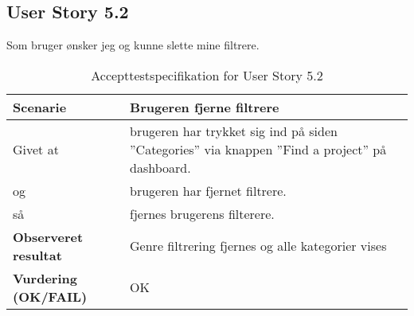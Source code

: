 \subsection{User Story 5.2}
Som bruger ønsker jeg og kunne slette mine filtrere. 

\begin{table}[H]
	\centering
	\caption{Accepttestspecifikation for User Story 5.2 }
	\begin{tabular}{p{6cm}|p{6cm}}
		\hline
		\textbf{Scenarie} & Brugeren fjerne filtrere\\[10px]
		\hline
        Givet at & brugeren har trykket sig ind på siden ''Categories'' via knappen ''Find a project'' på dashboard.\\
        \hline
        og & brugeren har fjernet filtrere.\\
        \hline
        så & fjernes brugerens filterere.\\
		\hline
		\rowcolor{white}
		\textbf{Observeret resultat} & Genre filtrering fjernes og alle kategorier vises\\
		\hline
		\textbf{Vurdering (OK/FAIL)} & OK\\
		\hline
	\end{tabular}
\end{table}